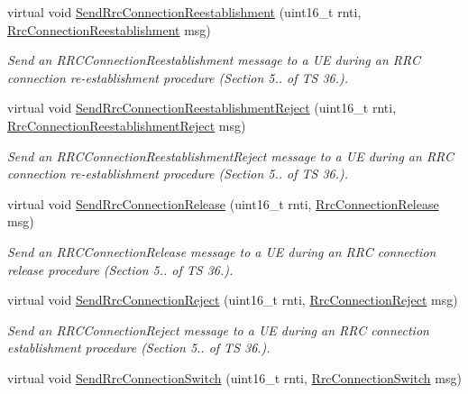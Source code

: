 \begin{DoxyCompactItemize}
virtual void \hyperlink{classns3_1_1MemberLteEnbRrcSapUser_a60e9a94a85dada8d96836a78c3f8eb64}{Send\+Rrc\+Connection\+Reestablishment} (uint16\+\_\+t rnti, \hyperlink{structns3_1_1LteRrcSap_1_1RrcConnectionReestablishment}{Rrc\+Connection\+Reestablishment} msg)
\begin{DoxyCompactList}\small\item\em Send an {\itshape R\+R\+C\+Connection\+Reestablishment} message to a UE during an R\+RC connection re-\/establishment procedure (Section 5.. of TS 36.). \end{DoxyCompactList}\item 
virtual void \hyperlink{classns3_1_1MemberLteEnbRrcSapUser_aad413457e726e6ea6319a364e6315e8c}{Send\+Rrc\+Connection\+Reestablishment\+Reject} (uint16\+\_\+t rnti, \hyperlink{structns3_1_1LteRrcSap_1_1RrcConnectionReestablishmentReject}{Rrc\+Connection\+Reestablishment\+Reject} msg)
\begin{DoxyCompactList}\small\item\em Send an {\itshape R\+R\+C\+Connection\+Reestablishment\+Reject} message to a UE during an R\+RC connection re-\/establishment procedure (Section 5.. of TS 36.). \end{DoxyCompactList}\item 
virtual void \hyperlink{classns3_1_1MemberLteEnbRrcSapUser_a4dcbc30669cda9f660ca033ff9675ada}{Send\+Rrc\+Connection\+Release} (uint16\+\_\+t rnti, \hyperlink{structns3_1_1LteRrcSap_1_1RrcConnectionRelease}{Rrc\+Connection\+Release} msg)
\begin{DoxyCompactList}\small\item\em Send an {\itshape R\+R\+C\+Connection\+Release} message to a UE during an R\+RC connection release procedure (Section 5.. of TS 36.). \end{DoxyCompactList}\item 
virtual void \hyperlink{classns3_1_1MemberLteEnbRrcSapUser_a9e496ccec07ab215041b70437eaad407}{Send\+Rrc\+Connection\+Reject} (uint16\+\_\+t rnti, \hyperlink{structns3_1_1LteRrcSap_1_1RrcConnectionReject}{Rrc\+Connection\+Reject} msg)
\begin{DoxyCompactList}\small\item\em Send an {\itshape R\+R\+C\+Connection\+Reject} message to a UE during an R\+RC connection establishment procedure (Section 5.. of TS 36.). \end{DoxyCompactList}\item 
virtual void \hyperlink{classns3_1_1MemberLteEnbRrcSapUser_a0a148e302995784e3107949e92c1e5d2}{Send\+Rrc\+Connection\+Switch} (uint16\+\_\+t rnti, \hyperlink{structns3_1_1LteRrcSap_1_1RrcConnectionSwitch}{Rrc\+Connection\+Switch} msg)

\end{DoxyCompactItemize}
